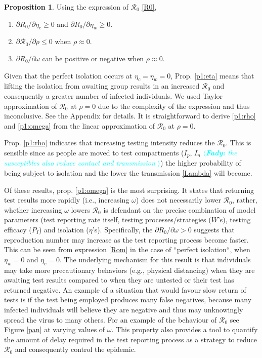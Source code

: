 \documentclass[12pt]{article}
\newcommand{\fady}[1]{\textcolor{cyan}{$\langle${\slshape{\bfseries Fady:} #1 }$\rangle$}}
\newcommand{\Rnum}{\mathcal{R}_0}
\theoremstyle{definition} %
\newtheorem{proposition}{Proposition}
\begin{document}
\begin{proposition}
\label{prop1}
Using the expression of $\Rnum$ \eqref{R0},
\begin{enumerate}
\item \label{p1:eta}
$\partial{R_0}/\partial{\eta_c} \geq 0$ and $\partial{R_0}/\partial{\eta_w} \geq 0$. 
\item \label{p1:rho}
$\partial{\Rnum}/\partial{\rho} \leq 0$ when $\rho \approx 0$.
\item \label{p1:omega}
$\partial{R_0}/\partial{\omega}$ can be positive or negative when $\rho \approx 0$.
\end{enumerate}
\end{proposition}

 Given that the perfect isolation occurs at $\eta_c=\eta_w = 0$, Prop. \ref{p1:eta} means that lifting the isolation from awaiting group results in an increased $\Rnum$ and consequently a greater number of infected individuals. We used Taylor approximation of $\Rnum$ at $\rho=0$ due to the complexity of the expression and thus inconclusive. See the Appendix for details. It is straightforward to derive \ref{p1:rho} and \ref{p1:omega} from the linear approximation of $\Rnum$ at $\rho=0$.
 
 Prop. \ref{p1:rho} indicates that increasing testing intensity reduces the $\Rnum$. This is sensible since as people are moved to test compartments ($I_p$, $I_n$ \fady{the susceptibles also reduce contact and transmission}) the higher probability of being subject to isolation and the lower the transmission \eqref{Lambda} will become.
 
 Of these results, prop. \ref{p1:omega} is the most surprising. It states that returning test results more rapidly (i.e., increasing $\omega$) does not necessarily lower $\Rnum$, rather, whether increasing $\omega$ lowers $\Rnum$ is defendant on the precise combination of model parameters (test reporting rate itself, testing processes/strategies ($W$'s), testing efficacy ($P_I$) and isolation ($\eta$'s). Specifically, the $\partial{R_0}/\partial{\omega}>0$ suggests that reproduction number may increase as the test reporting process become faster. This can be seen from expression \eqref{Rom} in the case of ``perfect isolation``, when $\eta_w=0$ and $\eta_c=0$. The underlying mechanism for this result is that individuals may take more precautionary behaviors (e.g., physical distancing) when they are awaiting test results compared to when they are untested or their test has returned negative. An example of a situation that would favour slow return of tests is if the test being employed produces many false negatives, because many infected individuals will believe they are negative and thus may unknowingly spread the virus to many others.  For an example of the behaviour of $\Rnum$ see Figure \ref{pan} at varying values of $\omega$. This property also provides a tool to quantify the amount of delay required in the test reporting process as a strategy to reduce $\Rnum$ and consequently control the epidemic.   
\end{document}

